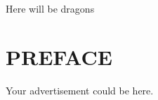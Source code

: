 \noindent
Here will be dragons
 
\noindent

\noindent

\noindent






\newpage
 
\chapter*{PREFACE}
\noindent 

Your advertisement could be here.




\newpage
\tableofcontents






%  
%  
%  
 



\newpage
\renewcommand{\chaptermark}[1]{\markboth{\thechapter. \ #1}{}}
\renewcommand{\sectionmark}[1]{\markright{}{}}
\lhead{\fancyplain{}{\leftmark}}
 
